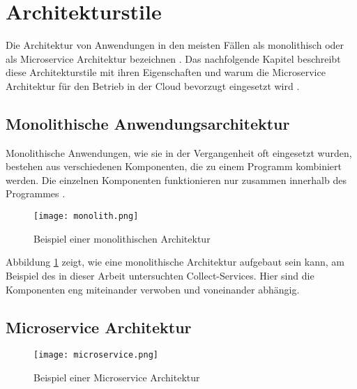 \section{Architekturstile}
Die Architektur von Anwendungen in den meisten Fällen als monolithisch oder als Microservice Architektur bezeichnen \cite[Vgl.][S. 150]{Gos2020}. Das nachfolgende Kapitel beschreibt diese Architekturstile mit ihren Eigenschaften und warum die Microservice Architektur für den Betrieb in der Cloud bevorzugt eingesetzt wird \cite[Vgl.][S. 1]{Villamizar2015}.

\subsection{Monolithische Anwendungsarchitektur}
Monolithische Anwendungen, wie sie in der Vergangenheit oft eingesetzt wurden, bestehen aus verschiedenen Komponenten, die zu einem Programm kombiniert werden. Die einzelnen Komponenten funktionieren nur zusammen innerhalb des Programmes \cite[Vgl.][S. 1]{Gos2020}.

\begin{figure}[H]
    \centering
    \texttt{[image: monolith.png]}
    \caption{Beispiel einer monolithischen Architektur \cite[Nachbildung angelehnt an][S. 150]{Gos2020}}
    \label{fig:monolith}
\end{figure}

Abbildung \ref{fig:monolith} zeigt, wie eine monolithische Architektur aufgebaut sein kann, am Beispiel des in dieser Arbeit untersuchten Collect-Services. Hier sind die Komponenten eng miteinander verwoben und voneinander abhängig.
\pagebreak

\subsection{Microservice Architektur}

\begin{figure}[H]
    \centering
    \texttt{[image: microservice.png]}
    \caption{Beispiel einer Microservice Architektur \cite[Nachbildung angelehnt an][S. 150]{Gos2020}}
    \label{fig:microservice}
\end{figure}

